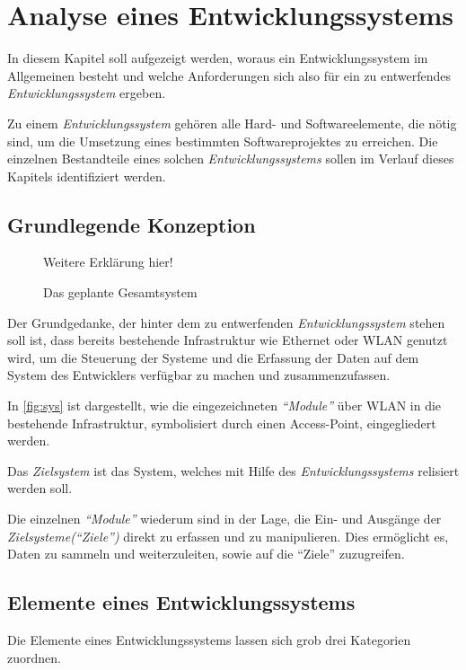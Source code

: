 \chapter{Analyse eines Entwicklungssystems}\label{chap:analyse}
\minitoc
In diesem Kapitel soll aufgezeigt werden, woraus ein Entwicklungssystem
im Allgemeinen besteht und welche Anforderungen sich also für ein zu
entwerfendes \emph{Entwicklungssystem} ergeben.
\begin{definition}[Entwicklungssystem]
Zu einem \emph{Entwicklungssystem} gehören
alle Hard- und Softwareelemente, die nötig sind, um die Umsetzung eines
bestimmten Softwareprojektes zu erreichen. Die einzelnen Bestandteile eines
solchen \emph{Entwicklungssystems} sollen im Verlauf dieses Kapitels
identifiziert werden.
\end{definition}
\section{Grundlegende Konzeption}
\begin{figure}[H]
\centering
\def\svgwidth{\columnwidth}

\caption{Das geplante Gesamtsystem}{Weitere Erklärung hier!}
\label{fig:sys}
\end{figure}
Der Grundgedanke, der hinter dem zu entwerfenden \emph{Entwicklungssystem}
stehen soll ist, dass bereits bestehende Infrastruktur wie Ethernet oder WLAN
genutzt wird, um die Steuerung der Systeme und die Erfassung der Daten
auf dem System des Entwicklers verfügbar zu machen und zusammenzufassen.

In \autoref{fig:sys} ist dargestellt, wie die eingezeichneten \emph{"`Module"'}
über WLAN in die bestehende Infrastruktur, symbolisiert durch einen
Access-Point, eingegliedert werden.
\begin{definition}[Zielsystem]
Das \emph{Zielsystem} ist das System, welches mit Hilfe des
\emph{Entwicklungssystems} relisiert werden soll.
\end{definition}
Die einzelnen \emph{"`Module"'} wiederum sind in der Lage, die Ein- und Ausgänge
der \emph{Zielsysteme("`Ziele"')} direkt zu erfassen und zu manipulieren. Dies
ermöglicht es, Daten zu sammeln und weiterzuleiten, sowie auf die "`Ziele"'
zuzugreifen.

\section{Elemente eines Entwicklungssystems}
Die Elemente eines Entwicklungssystems lassen sich grob drei Kategorien
zuordnen. 

